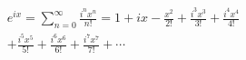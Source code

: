 \documentclass[preview]{standalone}
\begin{document}
\begin{align*}
e^{ix} = \sum_{n=0}^{\infty} \frac{i^nx^n}{n!} = 1 + ix - \frac{x^2}{2!} + \frac{i^3x^3}{3!} + \frac{i^4x^4}{4!} \\ + \frac{i^5x^5}{5!}+ \frac{i^6x^6}{6!} + \frac{i^7x^7}{7!} + \cdots
\end{align*}
\end{document}

